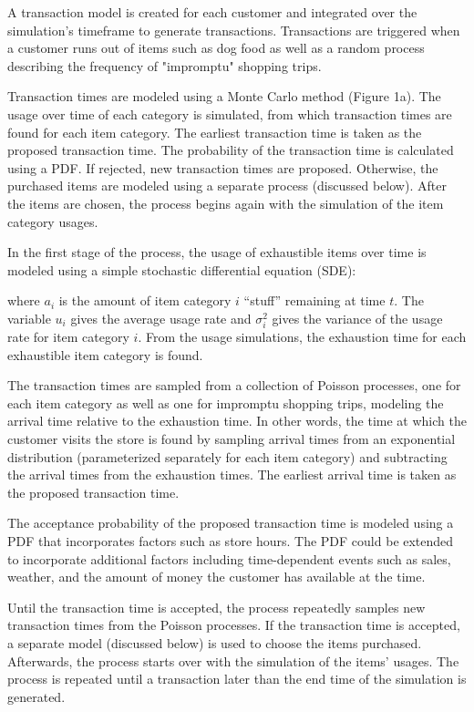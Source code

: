 \documentclass[conference]{IEEEtran}
\begin{document}
A transaction model is created for each customer and integrated over the simulation's timeframe to generate transactions.  Transactions are triggered when a customer runs out of items such as dog food as well as a random process describing the frequency of "impromptu" shopping trips.

Transaction times are modeled using a Monte Carlo method (Figure 1a).  The usage over time of each category is simulated, from which transaction times are found for each item category. The earliest transaction time is taken as the proposed transaction time.  The probability of the transaction time is calculated using a PDF.  If rejected, new transaction times are proposed.  Otherwise, the purchased items are modeled using a separate process (discussed below). After the items are chosen, the process begins again with the simulation of the item category usages.

In the first stage of the process, the usage of exhaustible items over time is modeled using a simple stochastic differential equation (SDE):

where $a_i$ is the amount of item category $i$ ``stuff'' remaining at time $t$. The variable $u_i$ gives the average usage rate and $\sigma^2_i$ gives the variance of the usage rate for item category $i$. From the usage simulations, the exhaustion time for each exhaustible item category is found.

The transaction times are sampled from a collection of Poisson processes, one for each item category as well as one for impromptu shopping trips, modeling the arrival time relative to the exhaustion time.  In other words, the time at which the customer visits the store is found by sampling arrival times from an exponential distribution (parameterized separately for each item category) and subtracting the arrival times from the exhaustion times.  The earliest arrival time is taken as the proposed transaction time.

The acceptance probability of the proposed transaction time is modeled using a PDF that incorporates factors such as store hours.  The PDF could be extended to incorporate additional factors including time-dependent events such as sales, weather, and the amount of money the customer has available at the time.

Until the transaction time is accepted, the process repeatedly samples new transaction times from the Poisson processes. If the transaction time is accepted, a separate model (discussed below) is used to choose the items purchased.  Afterwards, the process starts over with the simulation of the items' usages. The process is repeated until a transaction later than the end time of the simulation is generated.
\end{document}
